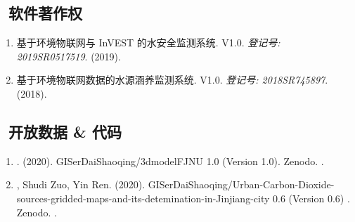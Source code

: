 \subsection*{\texorpdfstring{\faBook\ 软件著作权}{软件著作权}}
\begin{enumerate}
\item
   基于环境物联网与 InVEST 的水安全监测系统. V1.0.
    \textit{登记号: 2019SR0517519}. (2019).
\item
    基于环境物联网数据的水源涵养监测系统. V1.0.
    \textit{登记号: 2018SR745897}. (2018).
\end{enumerate}

\subsection*{\texorpdfstring{\faBook\ 开放数据 \& 代码}{开放数据 \& 代码}}
\begin{enumerate}
\item
   \Shaoqing. (2020).
    GISerDaiShaoqing/3dmodelFJNU 1.0 (Version 1.0). Zenodo. 
    .
\item
   \Shaoqing, Shudi Zuo, Yin Ren. (2020).
    GISerDaiShaoqing/Urban-Carbon-Dioxide-sources-gridded-maps-and-its-detemination-in-Jinjiang-city 0.6 (Version 0.6) . Zenodo. 
    .
\end{enumerate}

